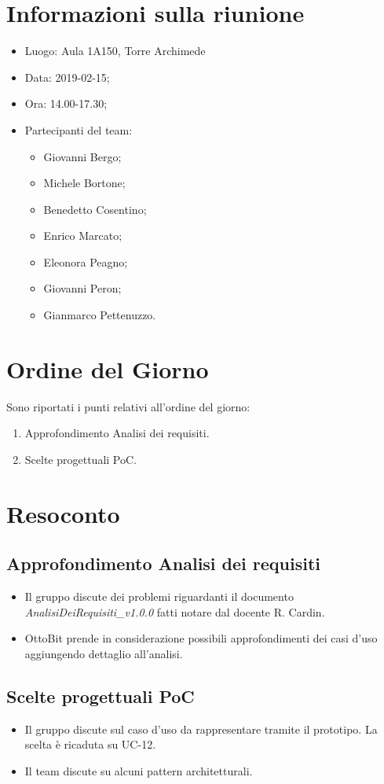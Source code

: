 \documentclass[11pt,a4paper]{article}
\begin{document}
	\section{Informazioni sulla riunione}
	\begin{itemize}
		\item Luogo: Aula 1A150, Torre Archimede
		\item Data: 2019-02-15;
		\item Ora: 14.00-17.30;
		\item Partecipanti del team:
			\begin{itemize}
				\item Giovanni Bergo;
				\item Michele Bortone;
				\item Benedetto Cosentino;
				\item Enrico Marcato;
				\item Eleonora Peagno;
				\item Giovanni Peron;
				\item Gianmarco Pettenuzzo.
			\end{itemize}
	\end{itemize}
	
	\section{Ordine del Giorno}
	Sono riportati i punti relativi all'ordine del giorno:
	\begin{enumerate}
		\item Approfondimento Analisi dei requisiti.
		\item Scelte progettuali PoC.
	\end{enumerate}
	
	\section{Resoconto}
		\subsection{Approfondimento Analisi dei requisiti}
	\begin{itemize}
		\item Il gruppo discute dei problemi riguardanti il documento \textit{AnalisiDeiRequisiti\_v1.0.0} fatti notare dal docente R. Cardin.
		\item OttoBit prende in considerazione possibili approfondimenti dei casi d'uso aggiungendo dettaglio all'analisi.
		
	\end{itemize}
	\subsection{Scelte progettuali PoC}
	\begin{itemize}
		\item Il gruppo discute sul caso d'uso da rappresentare tramite il prototipo. La scelta è ricaduta su UC-12.
		\item Il team discute su alcuni pattern architetturali.
	\end{itemize}
\end{document}
